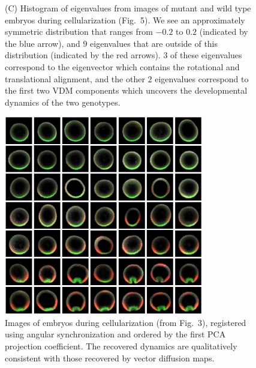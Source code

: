 \documentclass{pnastwo}
\newcommand{\fig}[0]{Fig.}
\begin{document}
\begin{figure}
{%
(C) Histogram of eigenvalues from images of mutant and wild type embryos during cellularization (\fig~5).
We see an approximately symmetric distribution that ranges from $-0.2$ to $0.2$ (indicated by the blue arrow), and $9$ eigenvalues that are outside of this distribution (indicated by the red arrows). $3$ of these eigenvalues correspond to the eigenvector which contains the rotational and translational alignment, and the other $2$ eigenvalues correspond to the first two VDM components which uncovers the developmental dynamics of the two genotypes.}
\label{fig:eval_spectra}
\end{figure}

\begin{figure}
\includegraphics[width=8.7cm]{PCA_ordered}
\caption{Images of embryos during cellularization (from \fig~3), registered using angular synchronization \cite{singer2011angular} and ordered by the first PCA projection coefficient. The recovered dynamics are qualitatively consistent with those recovered by vector diffusion maps. }
\label{fig:PCA_data1}
\end{figure}
\end{document}
